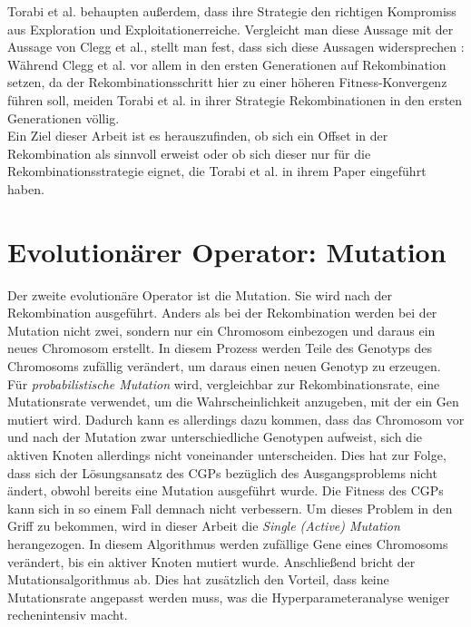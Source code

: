 Torabi et al. behaupten außerdem, dass ihre Strategie \glqq den richtigen Kompromiss aus Exploration und Exploitation\grqq\space erreiche. \cite{torabi_using_2022}
Vergleicht man diese Aussage mit der Aussage von Clegg et al., stellt man fest, dass sich diese Aussagen widersprechen \cite{clegg_new_2007}:
Während Clegg et al. vor allem in den ersten Generationen auf Rekombination setzen, da der Rekombinationsschritt hier zu einer höheren Fitness-Konvergenz führen soll, meiden Torabi et al. in ihrer Strategie Rekombinationen in den ersten Generationen völlig.\\
Ein Ziel dieser Arbeit ist es herauszufinden, ob sich ein Offset in der Rekombination als sinnvoll erweist oder ob sich dieser nur für die Rekombinationsstrategie eignet, die Torabi et al. in ihrem Paper eingeführt haben.


\section{Evolutionärer Operator: Mutation}
\label{subsec:Mutation}

Der zweite evolutionäre Operator ist die Mutation.
Sie wird nach der Rekombination ausgeführt.
Anders als bei der Rekombination werden bei der Mutation nicht zwei, sondern nur ein Chromosom einbezogen und daraus ein neues Chromosom erstellt.
In diesem Prozess werden Teile des Genotyps des Chromosoms zufällig verändert, um daraus einen neuen Genotyp zu erzeugen. \cite{milad_taleby_ahvanooey_survey_2019}\\
Für \emph{probabilistische Mutation} wird, vergleichbar zur Rekombinationsrate, eine Mutationsrate verwendet, um die Wahrscheinlichkeit anzugeben, mit der ein Gen mutiert wird.
Dadurch kann es allerdings dazu kommen, dass das Chromosom vor und nach der Mutation zwar unterschiedliche Genotypen aufweist, sich die aktiven Knoten allerdings nicht voneinander unterscheiden.
Dies hat zur Folge, dass sich der Lösungsansatz des CGPs bezüglich des Ausgangsproblems nicht ändert, obwohl bereits eine Mutation ausgeführt wurde.
Die Fitness des CGPs kann sich in so einem Fall demnach nicht verbessern.
Um dieses Problem in den Griff zu bekommen, wird in dieser Arbeit die \emph{Single (Active) Mutation} herangezogen.
In diesem Algorithmus werden zufällige Gene eines Chromosoms verändert, bis ein aktiver Knoten mutiert wurde.
Anschließend bricht der Mutationsalgorithmus ab. \cite{miller_cartesian_2020}
Dies hat zusätzlich den Vorteil, dass keine Mutationsrate angepasst werden muss, was die Hyperparameteranalyse weniger rechenintensiv macht.\\

